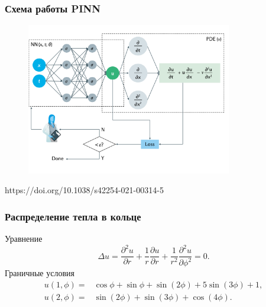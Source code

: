 \documentclass[t]{beamer}
\begin{document}
    \begin{frame}
        \frametitle{Схема работы PINN}
        \begin{figure}
            \center
            \includegraphics[width=0.8\textwidth]{PINN scheme.png}
        \end{figure}
        https://doi.org/10.1038/s42254-021-00314-5
    \end{frame}
    \begin{frame}
        \frametitle{Распределение тепла в кольце}
        Уравнение
        \begin{equation*}
            \Delta u = \frac{\partial^2 u}{\partial r} + \frac{1}{r} \frac{\partial u}{\partial r} + \frac{1}{r^2}\frac{\partial^2 u}{\partial \phi^2} = 0.
        \end{equation*}
        Граничные условия
        \begin{equation*}
            \begin{aligned}
                u(1,\phi)= & \cos\phi+\sin\phi+\sin(2\phi)+5\sin(3\phi)+1, \\
                u(2,\phi)= & \sin(2\phi)+\sin(3\phi)+\cos(4\phi).
            \end{aligned}
        \end{equation*}
    \end{frame}
\end{document}
